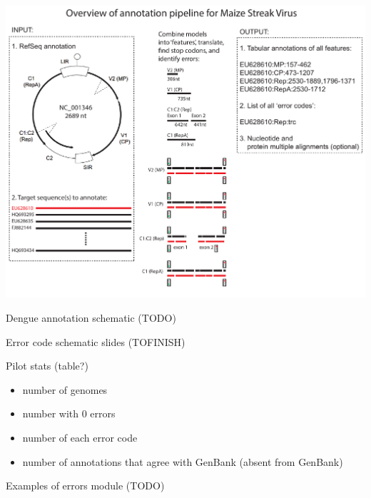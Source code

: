 \documentclass[landscape]{slides}
\begin{document}
\begin{slide}
\includegraphics[width=10in]{figs/annotation-schematic-4}
\vfill
\end{slide}
\begin{slide}

Dengue annotation schematic (TODO)

\vfill
\end{slide}
\begin{slide}

Error code schematic slides (TOFINISH)

\vfill
\end{slide}
\begin{slide}

Pilot stats (table?)
\begin{itemize}
\item number of genomes
\item number with 0 errors
\item number of each error code
\item number of annotations that agree with GenBank (absent from GenBank)
\end{itemize}

\vfill
\end{slide}
\begin{slide}

Examples of errors module (TODO)
\vfill
\end{slide}
\end{document}
